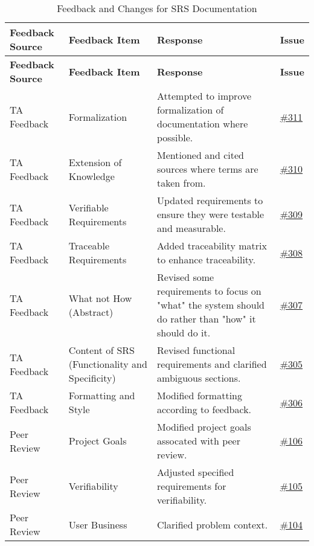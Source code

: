 \documentclass{article}
\begin{document}
\begin{longtable}{| p{} | p{} | p{} | p{} |}
    \caption{Feedback and Changes for SRS Documentation} \\
    \hline
    \textbf{Feedback Source} & \textbf{Feedback Item} & \textbf{Response} & \textbf{Issue} \\
    \hline
    \endfirsthead
    \hline
    \textbf{Feedback Source} & \textbf{Feedback Item} & \textbf{Response} & \textbf{Issue} \\
    \hline
    \endhead
    \hline
    \endfoot
    TA Feedback & Formalization & Attempted to improve formalization of documentation where possible. & \href{https://github.com/TPGEngine/tpg/issues/311}{\#311}\\
    \hline
    TA Feedback & Extension of Knowledge & Mentioned and cited sources where terms are taken from. & \href{https://github.com/TPGEngine/tpg/issues/310}{\#310} \\
    \hline
    TA Feedback & Verifiable Requirements & Updated requirements to ensure they were testable and measurable. & \href{https://github.com/TPGEngine/tpg/issues/309}{\#309}\\
    \hline
    TA Feedback & Traceable Requirements & Added traceability matrix to enhance traceability. & \href{https://github.com/TPGEngine/tpg/issues/308}{\#308} \\
    \hline
    TA Feedback & What not How (Abstract) & Revised some requirements to focus on "what" the system should do rather than "how" it should do it. & \href{https://github.com/TPGEngine/tpg/issues/307}{\#307} \\
    \hline
    TA Feedback & Content of SRS (Functionality and Specificity) & Revised functional requirements and clarified ambiguous sections. & \href{https://github.com/TPGEngine/tpg/issues/305}{\#305} \\
    \hline
    TA Feedback & Formatting and Style & Modified formatting according to feedback. & \href{https://github.com/TPGEngine/tpg/issues/306}{\#306} \\
    \hline
    Peer Review & Project Goals & Modified project goals assocated with peer review. & \href{https://github.com/TPGEngine/tpg/issues/106}{\#106} \\
    \hline
    Peer Review & Verifiability & Adjusted specified requirements for verifiability.  & \href{https://github.com/TPGEngine/tpg/issues/105}{\#105} \\
    \hline
    Peer Review & User Business & Clarified problem context. & \href{https://github.com/TPGEngine/tpg/issues/104}{\#104} \\

\end{longtable}
\end{document}
